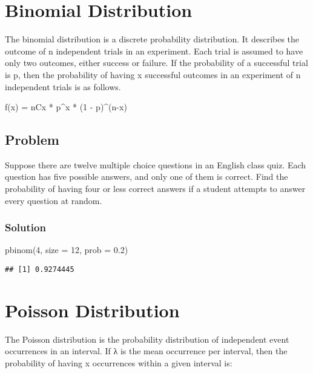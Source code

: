 \documentclass[
]{article}
\newenvironment{Shaded}{\begin{snugshade}}{\end{snugshade}}
\newcommand{\AttributeTok}[1]{\textcolor[rgb]{0.77,0.63,0.00}{#1}}
\newcommand{\DecValTok}[1]{\textcolor[rgb]{0.00,0.00,0.81}{#1}}
\newcommand{\FloatTok}[1]{\textcolor[rgb]{0.00,0.00,0.81}{#1}}
\newcommand{\FunctionTok}[1]{\textcolor[rgb]{0.00,0.00,0.00}{#1}}
\newcommand{\NormalTok}[1]{#1}
\begin{document}
\hypertarget{binomial-distribution}{%
\section{Binomial Distribution}\label{binomial-distribution}}

The binomial distribution is a discrete probability distribution. It
describes the outcome of n independent trials in an experiment. Each
trial is assumed to have only two outcomes, either success or failure.
If the probability of a successful trial is p, then the probability of
having x successful outcomes in an experiment of n independent trials is
as follows.

f(x) = nCx * p\^{}x * (1 - p)\^{}(n-x)

\hypertarget{problem-2}{%
\subsection{Problem}\label{problem-2}}

Suppose there are twelve multiple choice questions in an English class
quiz. Each question has five possible answers, and only one of them is
correct. Find the probability of having four or less correct answers if
a student attempts to answer every question at random.

\hypertarget{solution-2}{%
\subsubsection{Solution}\label{solution-2}}

\begin{Shaded}
\begin{Highlighting}[]
\FunctionTok{pbinom}\NormalTok{(}\DecValTok{4}\NormalTok{, }\AttributeTok{size =} \DecValTok{12}\NormalTok{, }\AttributeTok{prob =} \FloatTok{0.2}\NormalTok{)}
\end{Highlighting}
\end{Shaded}

\begin{verbatim}
## [1] 0.9274445
\end{verbatim}

\hypertarget{poisson-distribution}{%
\section{Poisson Distribution}\label{poisson-distribution}}

The Poisson distribution is the probability distribution of independent
event occurrences in an interval. If λ is the mean occurrence per
interval, then the probability of having x occurrences within a given
interval is:
\end{document}
